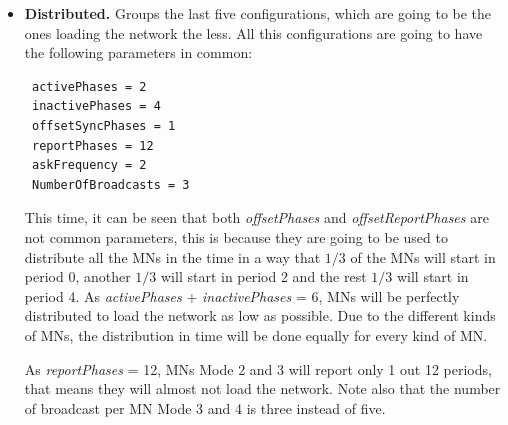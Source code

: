 \begin{itemize}
From this group, and attending to the number of \acp{MN} of each Mode (see Figure \ref{fig:ProtocolPhases}) this 5 configurations are proposed:
\begin{itemize}
 \item[-] \textbf{Config 1}: 15 \acp{MN} Mode 1, 15 \acp{MN} Mode 2, 15 \acp{MN} Mode 3 and 15 \acp{MN} Mode 4.
 \item[-] \textbf{Config 2}: 6 \acp{MN} Mode 1, 6 \acp{MN} Mode 2, 15 \acp{MN} Mode 3 and 33 \acp{MN} Mode 4.
 \item[-] \textbf{Config 3}: 6 \acp{MN} Mode 1, 6 \acp{MN} Mode 2, 33 \acp{MN} Mode 3 and 15 \acp{MN} Mode 4.
 \item[-] \textbf{Config 4}: 33 \acp{MN} Mode 1, 15 \acp{MN} Mode 2, 6 \acp{MN} Mode 3 and 6 \acp{MN} Mode 4.
 \item[-] \textbf{Config 5}: 15 \acp{MN} Mode 1, 33 \acp{MN} Mode 2, 6 \acp{MN} Mode 3 and 6 \acp{MN} Mode 4.
\end{itemize}
 \item \textbf{Distributed. }Groups the last five configurations, which are going to be the ones loading the network the less. All this
configurations are going to have the following parameters in common:
\begin{verbatim}
 activePhases = 2
 inactivePhases = 4
 offsetSyncPhases = 1
 reportPhases = 12
 askFrequency = 2
 NumberOfBroadcasts = 3
\end{verbatim}
This time, it can be seen that both \textit{offsetPhases} and \textit{offsetReportPhases} are not common parameters, this is because they are going to be
used to distribute all the \acp{MN} in the time in a way that $1/3$ of the \acp{MN} will start in period 0, another $1/3$ will start in period 2 and the 
rest $1/3$ will start in period 4. As \textit{activePhases} + \textit{inactivePhases} = 6, \acp{MN} will be perfectly distributed to load the network as 
low as possible. Due to the different kinds of \acp{MN}, the distribution in time will be done equally for every kind of \ac{MN}.

As \textit{reportPhases} = 12, \acp{MN} Mode 2 and 3 will report only 1 out 12 periods, that means they will almost not load the network. Note also that 
the number of broadcast per \ac{MN} Mode 3 and 4 is three instead of five.


\end{itemize}

